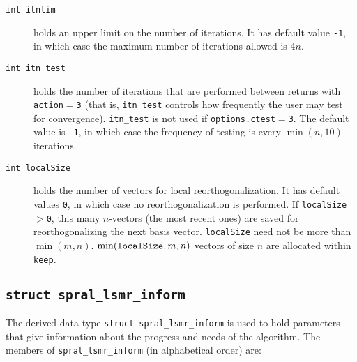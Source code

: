 \begin{description}
   \item[\texttt{int itnlim}]
      holds an upper limit on the number of iterations.
      It has default value {\tt -1}, in which case the 
      maximum number of iterations allowed is $4n$. 

   \item[\texttt{int itn\_test}]
      holds the number of iterations that are performed
      between returns with {\tt action}$ = ${\tt 3} (that is, {\tt itn\_test}
      controls how frequently the user may test for convergence).
      {\tt itn\_test} is not used if {\tt options.ctest}$=${\tt 3}.
      The default value is {\tt -1}, in which case the frequency of testing is 
      every $\min(n,10)$ iterations.

   \item[\texttt{int localSize}] holds the
      number of vectors for local reorthogonalization. It has default values
      {\tt 0}, in which case no reorthogonalization is performed.
      If {\tt localSize}$>${\tt0}, this many $n$-vectors  (the most recent ones)
      are saved for reorthogonalizing the next basis vector. {\tt localSize}
      need not be more than $\min(m,n)$. $\min({\tt localSize},m,n)$ vectors of
      size $n$ are allocated within {\tt keep}.
\end{description}


\subsection{\texttt{struct spral\_lsmr\_inform}}
\label{LSMR:type:inform}
The derived data type {\tt struct spral\_lsmr\_inform}
is used to hold parameters that give information about the progress and needs
of the algorithm. The members of {\tt spral\_lsmr\_inform}
(in alphabetical order) are:

